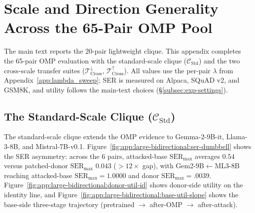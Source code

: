 \section{Scale and Direction Generality Across the 65-Pair OMP Pool}
\label{app:attack_results}

The main text reports the 20-pair lightweight clique. This appendix completes the 65-pair OMP evaluation with the standard-scale clique ($\mathcal{C}_{\text{Std}}$) and the two cross-scale transfer suites ($\mathcal{T}_{\text{Cross}}^{\downarrow}$, $\mathcal{T}_{\text{Cross}}^{\uparrow}$). All values use the per-pair $\lambda$ from Appendix~\ref{app:lambda_sweep}; SER is measured on Alpaca, SQuAD v2, and GSM8K, and utility follows the main-text choices (\S\ref{subsec:exp-settings}).

\subsection{The Standard-Scale Clique ($\mathcal{C}_{\text{Std}}$)}

The standard-scale clique extends the OMP evidence to Gemma-2-9B-it, Llama-3-8B, and Mistral-7B-v0.1.
Figure~\ref{fig:app:large-bidirectional:ser-dumbbell} shows the SER asymmetry: across the 6 pairs, attacked-base $\mathrm{SER}_{\max}$ averages $0.54$ versus patched-donor $\mathrm{SER}_{\max}$ $0.043$ (${>}12\times$ gap), with Gem2-9B$\leftarrow$ML3-8B reaching attacked-base $\mathrm{SER}_{\max}=1.0000$ and donor $\mathrm{SER}_{\max}=.0039$.
Figure~\ref{fig:app:large-bidirectional:donor-util-id} shows donor-side utility on the identity line, and Figure~\ref{fig:app:large-bidirectional:base-util-slope} shows the base-side three-stage trajectory (pretrained $\to$ after-OMP $\to$ after-attack).

